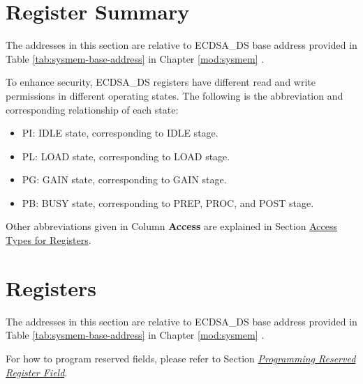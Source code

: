 \documentclass[main\_\_EN.tex]{subfiles}
\begin{document}


\newpage
\hypertarget{ecdsa-reg-summ}{}
\section{Register Summary}
\label{sec:ecdsa-reg-summ}

The addresses in this section are relative to ECDSA\_DS base address provided in Table \ref{tab:sysmem-base-address} in Chapter \ref{mod:sysmem} \textit{}.

To enhance security, ECDSA\_DS registers have different read and write permissions in different operating states. The following is the abbreviation and corresponding relationship of each state:

\begin{itemize}
    \item PI: IDLE state, corresponding to IDLE stage.
    \item PL: LOAD state, corresponding to LOAD stage.
    \item PG: GAIN state, corresponding to GAIN stage.
    \item PB: BUSY state, corresponding to PREP, PROC, and POST stage.
\end{itemize}

Other abbreviations given in Column \textbf{Access} are explained in Section \hyperref[glossary-access-types]{Access Types for Registers}.






\newpage
\section{Registers}

The addresses in this section are relative to ECDSA\_DS base address provided in Table \ref{tab:sysmem-base-address} in Chapter \ref{mod:sysmem} \textit{}.

For how to program reserved fields, please refer to Section \hyperref[programming-reserved-field]{\textit{Programming Reserved Register Field}}.


\end{document}
